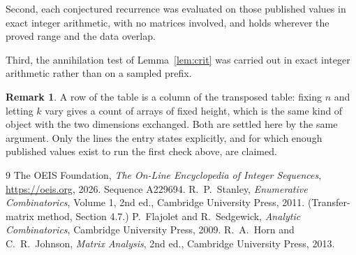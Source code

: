 \documentclass[11pt,a4paper]{article}
\theoremstyle{plain}
\theoremstyle{definition}
\newtheorem{remark}[theorem]{Remark}
\begin{document}
Second, each conjectured recurrence was evaluated on those published values in exact
integer arithmetic, with no matrices involved, and holds wherever the proved range and the
data overlap.

Third, the annihilation test of Lemma~\ref{lem:crit} was carried out in exact integer
arithmetic rather than on a sampled prefix.

\begin{remark}
A row of the table is a column of the transposed table: fixing $n$ and letting $k$ vary gives a
count of arrays of fixed height, which is the same kind of object with the two dimensions
exchanged. Both are settled here by the same argument. Only the lines the entry states
explicitly, and for which enough published values exist to run the first check above, are
claimed.
\end{remark}

\begin{thebibliography}{9}
 The OEIS Foundation, \emph{The On-Line Encyclopedia of Integer
Sequences}, \url{https://oeis.org}, 2026. Sequence A229694.
 R.~P.~Stanley, \emph{Enumerative Combinatorics}, Volume 1, 2nd ed.,
Cambridge University Press, 2011. (Transfer-matrix method, Section 4.7.)
 P.~Flajolet and R.~Sedgewick, \emph{Analytic Combinatorics}, Cambridge
University Press, 2009.
 R.~A.~Horn and C.~R.~Johnson, \emph{Matrix Analysis}, 2nd ed., Cambridge
University Press, 2013.
\end{thebibliography}
\end{document}
